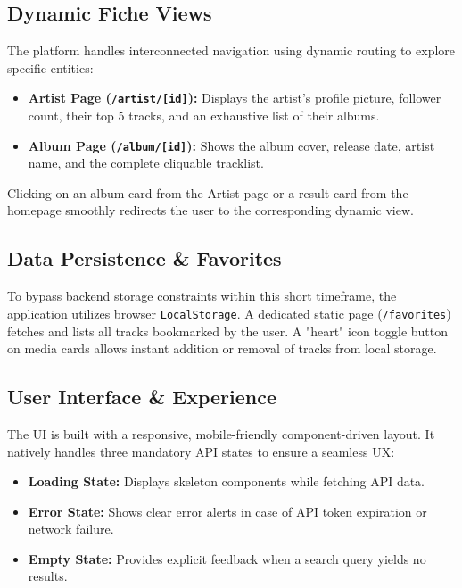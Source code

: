 \documentclass{article}
\begin{document}
\subsection{Dynamic Fiche Views}
The platform handles interconnected navigation using dynamic routing to explore specific entities:

\begin{itemize}
    \item \textbf{Artist Page (\texttt{/artist/[id]}):} Displays the artist's profile picture, follower count, their top 5 tracks, and an exhaustive list of their albums.
    \item \textbf{Album Page (\texttt{/album/[id]}):} Shows the album cover, release date, artist name, and the complete cliquable tracklist.
\end{itemize}

Clicking on an album card from the Artist page or a result card from the homepage smoothly redirects the user to the corresponding dynamic view.



\subsection{Data Persistence \& Favorites}

To bypass backend storage constraints within this short timeframe, the application utilizes browser \texttt{LocalStorage}. A dedicated static page (\texttt{/favorites}) fetches and lists all tracks bookmarked by the user. A "heart" icon toggle button on media cards allows instant addition or removal of tracks from local storage.



\subsection{User Interface \& Experience}

The UI is built with a responsive, mobile-friendly component-driven layout. It natively handles three mandatory API states to ensure a seamless UX:

\begin{itemize}
    \item \textbf{Loading State:} Displays skeleton components while fetching API data.
    \item \textbf{Error State:} Shows clear error alerts in case of API token expiration or network failure.
    \item \textbf{Empty State:} Provides explicit feedback when a search query yields no results.
\end{itemize}  
\end{document}
